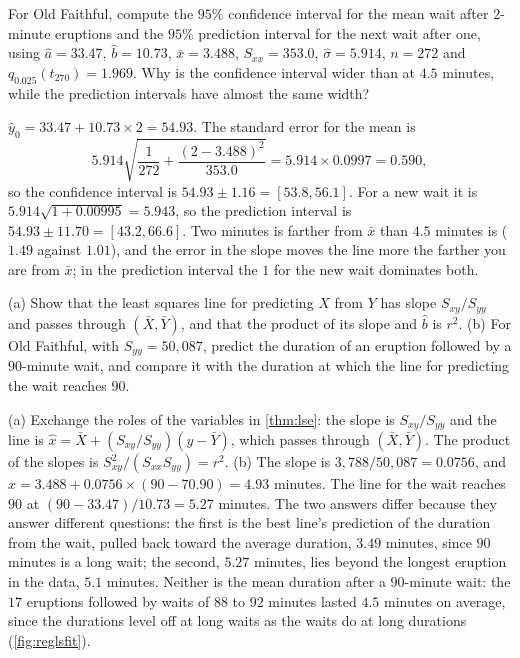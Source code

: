\begin{exercise}
\label{ex:reg-predict}
For Old Faithful, compute the $95\%$ confidence interval for the mean wait after $2$-minute eruptions and the $95\%$ prediction interval for the next wait after one, using $\hat{a} = 33.47$, $\hat{b} = 10.73$, $\bar{x} = 3.488$, $S_{xx} = 353.0$, $\hat{\sigma} = 5.914$, $n = 272$ and $q_{0.025}(t_{270}) = 1.969$. Why is the confidence interval wider than at $4.5$ minutes, while the prediction intervals have almost the same width?
\end{exercise}
\begin{solution}
$\hat{y}_0 = 33.47 + 10.73 \times 2 = 54.93$. The standard error for the mean is
\[
5.914\sqrt{\frac{1}{272} + \frac{(2 - 3.488)^2}{353.0}} = 5.914 \times 0.0997 = 0.590,
\]
so the confidence interval is $54.93 \pm 1.16 = [53.8, 56.1]$. For a new wait it is $5.914\sqrt{1 + 0.00995} = 5.943$, so the prediction interval is $54.93 \pm 11.70 = [43.2, 66.6]$. Two minutes is farther from $\bar{x}$ than $4.5$ minutes is ($1.49$ against $1.01$), and the error in the slope moves the line more the farther you are from $\bar{x}$; in the prediction interval the $1$ for the new wait dominates both.
\end{solution}

\begin{exercise}
\label{ex:reg-reverse}
(a) Show that the least squares line for predicting $X$ from $Y$ has slope $S_{xy}/S_{yy}$ and passes through $(\bar{X}, \bar{Y})$, and that the product of its slope and $\hat{b}$ is $r^2$. (b) For Old Faithful, with $S_{yy} = 50{,}087$, predict the duration of an eruption followed by a $90$-minute wait, and compare it with the duration at which the line for predicting the wait reaches $90$.
\end{exercise}
\begin{solution}
(a) Exchange the roles of the variables in \cref{thm:lse}: the slope is $S_{xy}/S_{yy}$ and the line is $\hat{x} = \bar{X} + (S_{xy}/S_{yy})(y - \bar{Y})$, which passes through $(\bar{X}, \bar{Y})$. The product of the slopes is $S_{xy}^2/(S_{xx}S_{yy}) = r^2$. (b) The slope is $3{,}788/50{,}087 = 0.0756$, and $\hat{x} = 3.488 + 0.0756 \times (90 - 70.90) = 4.93$ minutes. The line for the wait reaches $90$ at $(90 - 33.47)/10.73 = 5.27$ minutes. The two answers differ because they answer different questions: the first is the best line's prediction of the duration from the wait, pulled back toward the average duration, $3.49$ minutes, since $90$ minutes is a long wait; the second, $5.27$ minutes, lies beyond the longest eruption in the data, $5.1$ minutes. Neither is the mean duration after a $90$-minute wait: the $17$ eruptions followed by waits of $88$ to $92$ minutes lasted $4.5$ minutes on average, since the durations level off at long waits as the waits do at long durations (\cref{fig:reglsfit}).
\end{solution}

